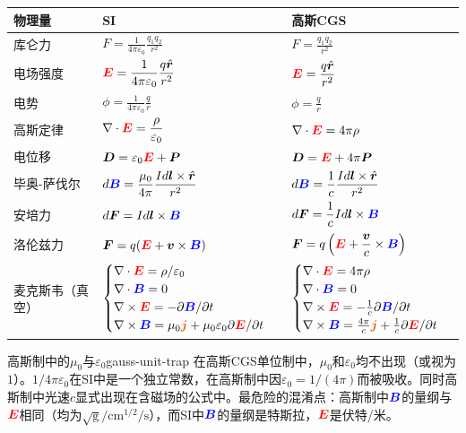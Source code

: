 \documentclass[11pt,a4paper,openany,oneside]{book}
\newcommand{\vecE}{\textcolor{red}{\vect{E}}}
\newcommand{\vecB}{\textcolor{blue}{\vect{B}}}
\newcommand{\vecJ}{\textcolor{cororange}{\vect{j}}}
\newcommand{\eps}{\varepsilon}
\newcommand{\muz}{\mu_0}
\newcommand{\vect}[1]{\bm{#1}}
\newcommand{\unitvec}[1]{\hat{\vect{#1}}}
\newcommand{\curl}{\nabla\times}
\newcommand{\divg}{\nabla\cdot}
\begin{document}
\begin{center}
\begin{tabular}{@{}lll@{}}
\toprule
\textbf{物理量} & \textbf{SI} & \textbf{高斯CGS} \\
\midrule
库仑力 & $\displaystyle F=\frac{1}{4\pi\eps_0}\frac{q_1 q_2}{r^2}$ & $\displaystyle F=\frac{q_1 q_2}{r^2}$ \\
电场强度 & $\displaystyle \vecE=\frac{1}{4\pi\eps_0}\frac{q\unitvec{r}}{r^2}$ & $\displaystyle \vecE=\frac{q\unitvec{r}}{r^2}$ \\
电势 & $\displaystyle \phi=\frac{1}{4\pi\eps_0}\frac{q}{r}$ & $\displaystyle \phi=\frac{q}{r}$ \\
高斯定律 & $\displaystyle \divg\vecE=\frac{\rho}{\eps_0}$ & $\displaystyle \divg\vecE=4\pi\rho$ \\
电位移 & $\displaystyle \vect{D}=\eps_0\vecE+\vect{P}$ & $\displaystyle \vect{D}=\vecE+4\pi\vect{P}$ \\
毕奥-萨伐尔 & $\displaystyle d\vecB=\frac{\muz}{4\pi}\frac{I d\vect{l}\times\unitvec{r}}{r^2}$ & $\displaystyle d\vecB=\frac{1}{c}\frac{I d\vect{l}\times\unitvec{r}}{r^2}$ \\
安培力 & $\displaystyle d\vect{F}=I d\vect{l}\times\vecB$ & $\displaystyle d\vect{F}=\frac{1}{c}I d\vect{l}\times\vecB$ \\
洛伦兹力 & $\displaystyle \vect{F}=q(\vecE+\vect{v}\times\vecB)$ & $\displaystyle \vect{F}=q\left(\vecE+\frac{\vect{v}}{c}\times\vecB\right)$ \\
麦克斯韦（真空） & $\begin{cases}\divg\vecE=\rho/\eps_0\\\divg\vecB=0\\\curl\vecE=-\partial\vecB/\partial t\\\curl\vecB=\muz\vecJ+\muz\eps_0\partial\vecE/\partial t\end{cases}$ & $\begin{cases}\divg\vecE=4\pi\rho\\\divg\vecB=0\\\curl\vecE=-\frac{1}{c}\partial\vecB/\partial t\\\curl\vecB=\frac{4\pi}{c}\vecJ+\frac{1}{c}\partial\vecE/\partial t\end{cases}$ \\
\bottomrule
\end{tabular}
\end{center}

\begin{warning}{高斯制中的$\muz$与$\eps_0$}{gauss-unit-trap}
在高斯CGS单位制中，$\muz$和$\eps_0$均不出现（或视为$1$）。$1/4\pi\eps_0$在SI中是一个独立常数，在高斯制中因$\eps_0=1/(4\pi)$而被吸收。同时高斯制中光速$c$显式出现在含磁场的公式中。最危险的混淆点：高斯制中$\vecB$的量纲与$\vecE$相同（均为$\sqrt{\text{g}}/\text{cm}^{1/2}/\text{s}$），而SI中$\vecB$的量纲是特斯拉，$\vecE$是伏特/米。
\end{warning}
\end{document}
